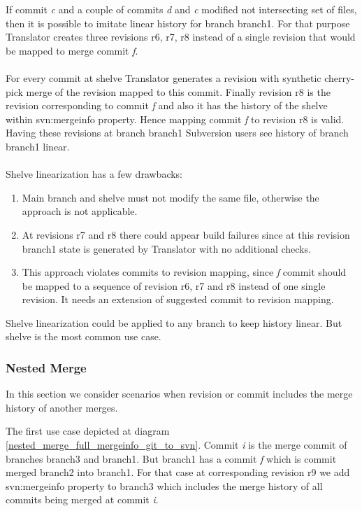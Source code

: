 If commit \emph{c} and a couple of commits \emph{d} and \emph{c} modified not intersecting set of files, then it is possible to imitate linear history for branch branch1. For that purpose Translator creates three revisions r6, r7, r8 instead of a single revision that would be mapped to merge commit \emph{f}.
\\\\
For every commit at shelve Translator generates a revision with synthetic cherry-pick merge of the revision mapped to this commit. Finally revision r8 is the revision corresponding to commit \emph{f} and also it has the history of the shelve within svn:mergeinfo property. Hence mapping commit \emph{f} to revision r8 is valid. Having these revisions at branch branch1 Subversion users see history of branch branch1 linear.
\\\\
Shelve linearization has a few drawbacks:
\begin{enumerate}
\compactlist
	\item Main branch and shelve must not modify the same file, otherwise the approach is not applicable.
	\item At revisions r7 and r8 there could appear build failures since at this revision branch1 state is generated by Translator with no additional checks.
	\item This approach violates commits to revision mapping, since \emph{f} commit should be mapped to a sequence of revision r6, r7 and r8 instead of one single revision. It needs an extension of suggested commit to revision mapping.
\end{enumerate}

Shelve linearization could be applied to any branch to keep history linear. But shelve is the most common use case.

\subsubsection{Nested Merge}

In this section we consider scenarios when revision or commit includes the merge history of another merges.

The first use case depicted at diagram \ref{nested_merge_full_mergeinfo_git_to_svn}. Commit \emph{i} is the merge commit of branches branch3 and branch1. But branch1 has a commit \emph{f} which is commit merged branch2 into branch1. For that case at corresponding revision r9 we add svn:mergeinfo property to branch3 which includes the merge history of all commits being merged at commit \emph{i}.

